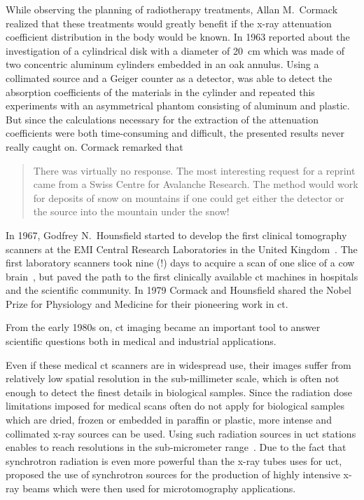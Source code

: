 While observing the planning of radiotherapy treatments, Allan M.\ Cormack realized that these treatments would greatly benefit if the x-ray attenuation coefficient distribution in the body would be known. In 1963 \citet{Cormack1963} reported about the investigation of a cylindrical disk with a diameter of \SI{20}{\centi\meter} which was made of two concentric aluminum cylinders embedded in an oak annulus. Using a collimated  source and a Geiger counter as a detector, \citeauthor{Cormack1963} was able to detect the absorption coefficients of the materials in the cylinder and repeated this experiments with an asymmetrical phantom consisting of aluminum and plastic. But since the calculations necessary for the extraction of the attenuation coefficients were both time-consuming and difficult, the presented results never really caught on. Cormack remarked that \begin{quote} There was virtually no response. The most interesting request for a reprint came from a Swiss Centre for Avalanche Research. The method would work for deposits of snow on mountains if one could get either the detector or the source into the mountain under the snow! \cite{Cormack1979}\end{quote}

In 1967, Godfrey N.\ Hounsfield started to develop the first clinical tomography scanners at the EMI Central Research Laboratories in the United Kingdom~\cite{Hsieh2003}. The first laboratory scanners took nine (!) days to acquire a scan of one slice of a cow brain~\cite{Hounsfield1976}, but paved the path to the first clinically available \ac{ct} machines in hospitals and the scientific community. In 1979 Cormack and Hounsfield shared the Nobel Prize for Physiology and Medicine for their pioneering work in \ac{ct}.

From the early 1980s on, \ac{ct} imaging became an important tool to answer scientific questions both in medical and industrial applications.

Even if these medical \ac{ct} scanners are in widespread use, their images suffer from relatively low spatial resolution in the sub-millimeter scale, which is often not enough to detect the finest details in biological samples. Since the radiation dose limitations imposed for medical scans often do not apply for biological samples which are dried, frozen or embedded in paraffin or plastic, more intense and collimated x-ray sources can be used. Using such radiation sources in \ac{uct} stations enables to reach resolutions in the sub-micrometer range~\cite{Bonse2008}. Due to the fact that synchrotron radiation is even more powerful than the x-ray tubes uses for \ac{uct}, \citet{Grodzins1983,Grodzins1983a} proposed the use of synchrotron sources for the production of highly intensive x-ray beams which were then used for microtomography applications.

